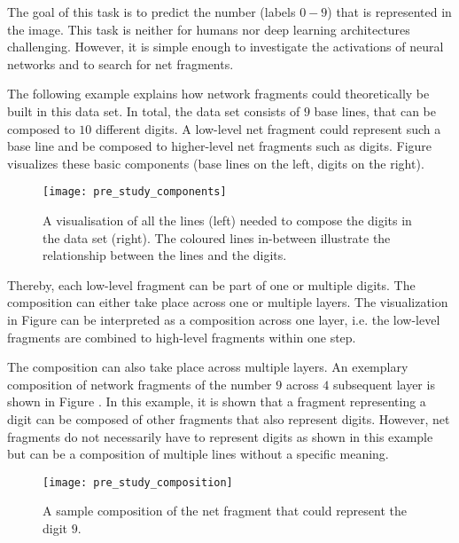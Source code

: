 The goal of this task is to predict the number (labels $0-9$) that is represented in the image.
This task is neither for humans nor deep learning architectures challenging.
However, it is simple enough to investigate the activations of neural networks and to search for net fragments.

The following example explains how network fragments could theoretically be built in this data set.
In total, the data set consists of $9$ base lines, that can be composed to $10$ different digits.
A low-level net fragment could represent such a base line and be composed to higher-level net fragments such as digits.
Figure  visualizes these basic components (base lines on the left, digits on the right).

\begin{figure}[h]
    \centering
    \texttt{[image: pre\_study\_components]}
    \caption[Line Types in Straight Line Digits Dataset]{A visualisation of all the lines (left) needed to compose the digits in the data set (right). The coloured lines in-between illustrate the relationship between the lines and the digits.}
\end{figure}

Thereby, each low-level fragment can be part of one or multiple digits.
The composition can either take place across one or multiple layers.
The visualization in Figure  can be interpreted as a composition across one layer, i.e. the low-level fragments are combined to high-level fragments within one step.

The composition can also take place across multiple layers. 
An exemplary composition of network fragments of the number $9$ across $4$ subsequent layer is shown in Figure .
In this example, it is shown that a fragment representing a digit can be composed of other fragments that also represent digits.
However, net fragments do not necessarily have to represent digits as shown in this example but can be a composition of multiple lines without a specific meaning.

\begin{figure}[h]
    \centering
    \texttt{[image: pre\_study\_composition]}
    \caption[Sample Net Fragment Composition]{A sample composition of the net fragment that could represent the digit $9$.}
\end{figure}

